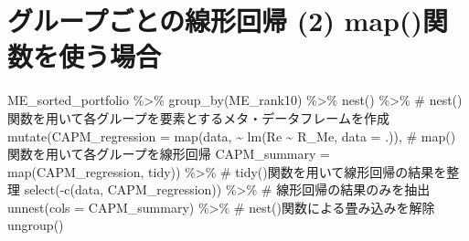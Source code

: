 \documentclass[
  letterpaper,
  DIV=11,
  numbers=noendperiod]{scrreprt}
\newenvironment{Shaded}{\begin{snugshade}}{\end{snugshade}}
\newcommand{\AttributeTok}[1]{\textcolor[rgb]{0.40,0.45,0.13}{#1}}
\newcommand{\CommentTok}[1]{\textcolor[rgb]{0.37,0.37,0.37}{#1}}
\newcommand{\ControlFlowTok}[1]{\textcolor[rgb]{0.00,0.23,0.31}{\textbf{#1}}}
\newcommand{\FunctionTok}[1]{\textcolor[rgb]{0.28,0.35,0.67}{#1}}
\newcommand{\NormalTok}[1]{\textcolor[rgb]{0.00,0.23,0.31}{#1}}
\newcommand{\OtherTok}[1]{\textcolor[rgb]{0.00,0.23,0.31}{#1}}
\newcommand{\SpecialCharTok}[1]{\textcolor[rgb]{0.37,0.37,0.37}{#1}}
\begin{document}
\begin{Shaded}
\end{Shaded}

\section{グループごとの線形回帰 (2)
map()関数を使う場合}\label{ux30b0ux30ebux30fcux30d7ux3054ux3068ux306eux7ddaux5f62ux56deux5e30-2-mapux95a2ux6570ux3092ux4f7fux3046ux5834ux5408}

\begin{Shaded}
\begin{Highlighting}[]
\NormalTok{ME\_sorted\_portfolio }\SpecialCharTok{\%\textgreater{}\%}
  \FunctionTok{group\_by}\NormalTok{(ME\_rank10) }\SpecialCharTok{\%\textgreater{}\%}
  \FunctionTok{nest}\NormalTok{() }\SpecialCharTok{\%\textgreater{}\%} \CommentTok{\# nest()関数を用いて各グループを要素とするメタ・データフレームを作成}
  \FunctionTok{mutate}\NormalTok{(}\AttributeTok{CAPM\_regression =} \FunctionTok{map}\NormalTok{(data, }\SpecialCharTok{\textasciitilde{}} \FunctionTok{lm}\NormalTok{(Re }\SpecialCharTok{\textasciitilde{}}\NormalTok{ R\_Me, }\AttributeTok{data =}\NormalTok{ .)), }\CommentTok{\# map()関数を用いて各グループを線形回帰}
         \AttributeTok{CAPM\_summary =} \FunctionTok{map}\NormalTok{(CAPM\_regression, tidy)) }\SpecialCharTok{\%\textgreater{}\%} \CommentTok{\# tidy()関数を用いて線形回帰の結果を整理}
  \FunctionTok{select}\NormalTok{(}\SpecialCharTok{{-}}\FunctionTok{c}\NormalTok{(data, CAPM\_regression)) }\SpecialCharTok{\%\textgreater{}\%} \CommentTok{\# 線形回帰の結果のみを抽出}
  \FunctionTok{unnest}\NormalTok{(}\AttributeTok{cols =}\NormalTok{ CAPM\_summary) }\SpecialCharTok{\%\textgreater{}\%} \CommentTok{\# nest()関数による畳み込みを解除}
  \FunctionTok{ungroup}\NormalTok{()}
\end{Highlighting}
\end{Shaded}
\end{document}
